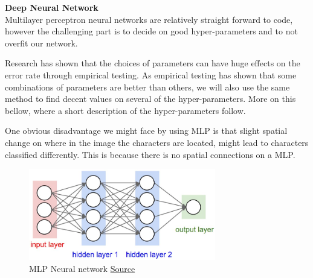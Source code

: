 \documentclass[11pt,a4paper,UKenglish]{article}
\begin{document}
\begin{flushleft}
  \textbf{Deep Neural Network} \\
  Multilayer perceptron neural networks are relatively straight
  forward to code, however the challenging part is to decide on good
  hyper-parameters and to not overfit our network. \par
  Research has shown that the choices of parameters can have huge effects on
  the error rate through empirical testing. As empirical testing has shown that
  some combinations of parameters are better than others, we will also use the
  same method to find decent values on several of the hyper-parameters. More on
  this bellow, where a short description of the hyper-parameters follow. \par
  One obvious disadvantage we might face by using MLP is that slight spatial
  change on where in the image the characters are located, might lead to
  characters classified differently. This is because there is no spatial
  connections on a MLP.
\end{flushleft}

\begin{figure}[H]
  \centering
  \includegraphics[height=4cm]{res/neural_net2.jpeg}
  \caption{MLP Neural network \href{http://cs231n.github.io/neural-networks-1/}{Source}}
  \label{fig:neural_net2}
\end{figure}
\end{document}
